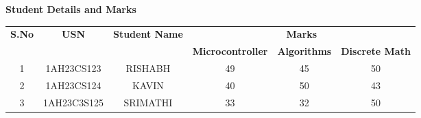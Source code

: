 \documentclass{article}
\begin{document}
	\centering
	\textbf{\Large{Student Details and Marks}}
	\vspace{0.1in}
	\begin{table}[h]
		\centering
		\begin{tabular}{|c|c|c|c|c|c|}
			\hline
			\multirow{2}{*}{\textbf{S.No}} & \multirow{2}{*}{\textbf{USN}} &
			\multirow{2}{*}{\textbf{Student Name}} & \multicolumn{3}{c|}{\textbf{Marks}} \\
			\cline{4-6}
			& & & \textbf{Microcontroller} & \textbf{Algorithms} & \textbf{Discrete Math} \\
			\hline
			\multicolumn{1}{|c|}{1} & \multicolumn{1}{c|}{1AH23CS123} & \multicolumn{1}{c|}{RISHABH} & 49 & 45 & 50 \\
			\hline
			\multicolumn{1}{|c|}{2} & \multicolumn{1}{c|}{1AH23CS124} & \multicolumn{1}{c|}{KAVIN} & 40 & 50 & 43 \\
			\hline
			\multicolumn{1}{|c|}{3} & \multicolumn{1}{c|}{1AH23C3S125} & \multicolumn{1}{c|}{SRIMATHI} & 33 & 32 & 50 \\
			\hline
		\end{tabular}
	\end{table}
\end{document}
